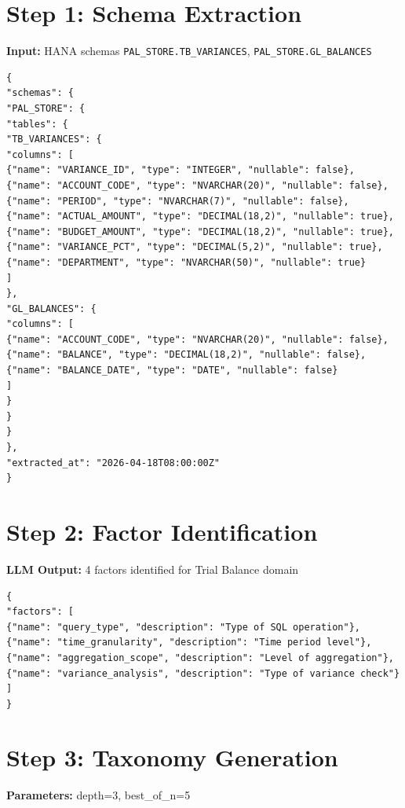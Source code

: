 \documentclass[12pt,a4paper,twoside]{report}
\begin{document}
\section{Step 1: Schema Extraction}

\textbf{Input:} HANA schemas \texttt{PAL\_STORE.TB\_VARIANCES}, \texttt{PAL\_STORE.GL\_BALANCES}

\begin{lstlisting}[language=jsonx,caption={Schema extraction output (schemas.json)}]
{
"schemas": {
"PAL_STORE": {
"tables": {
"TB_VARIANCES": {
"columns": [
{"name": "VARIANCE_ID", "type": "INTEGER", "nullable": false},
{"name": "ACCOUNT_CODE", "type": "NVARCHAR(20)", "nullable": false},
{"name": "PERIOD", "type": "NVARCHAR(7)", "nullable": false},
{"name": "ACTUAL_AMOUNT", "type": "DECIMAL(18,2)", "nullable": true},
{"name": "BUDGET_AMOUNT", "type": "DECIMAL(18,2)", "nullable": true},
{"name": "VARIANCE_PCT", "type": "DECIMAL(5,2)", "nullable": true},
{"name": "DEPARTMENT", "type": "NVARCHAR(50)", "nullable": true}
]
},
"GL_BALANCES": {
"columns": [
{"name": "ACCOUNT_CODE", "type": "NVARCHAR(20)", "nullable": false},
{"name": "BALANCE", "type": "DECIMAL(18,2)", "nullable": false},
{"name": "BALANCE_DATE", "type": "DATE", "nullable": false}
]
}
}
}
},
"extracted_at": "2026-04-18T08:00:00Z"
}
\end{lstlisting}

\section{Step 2: Factor Identification}

\textbf{LLM Output:} 4 factors identified for Trial Balance domain

\begin{lstlisting}[language=jsonx,caption={Factors (factors.json)}]
{
"factors": [
{"name": "query_type", "description": "Type of SQL operation"},
{"name": "time_granularity", "description": "Time period level"},
{"name": "aggregation_scope", "description": "Level of aggregation"},
{"name": "variance_analysis", "description": "Type of variance check"}
]
}
\end{lstlisting}

\section{Step 3: Taxonomy Generation}

\textbf{Parameters:} depth=3, best\_of\_n=5
\end{document}
